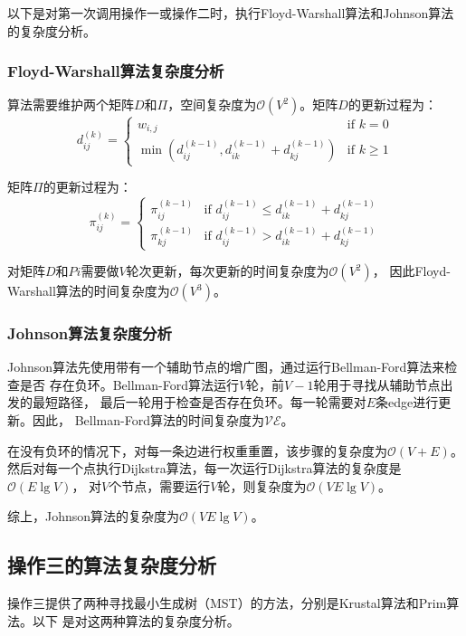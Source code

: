 \documentclass{article}
\begin{document}
以下是对第一次调用操作一或操作二时，执行Floyd-Warshall算法和Johnson算法的复杂度分析。

\subsubsection{Floyd-Warshall算法复杂度分析}
算法需要维护两个矩阵$D$和$\Pi$，空间复杂度为$\mathcal{O}(V^2)$。矩阵$D$的更新过程为：
\begin{equation}
	d_{ij}^{(k)} = 
	\begin{cases}
		w_{i,j} & \text{if  $k=0$} \\
		\min (d_{ij}^{(k-1)}, d_{ik}^{(k-1)} + d_{kj}^{(k-1)}) & \text{if  $k\ge 1$}
	\end{cases} \end{equation}
		


矩阵$\Pi$的更新过程为：
\begin{equation}
	\pi_{ij}^{(k)} = 
	\begin{cases}
		\pi_{ij}^{(k-1)} & \text{if  $d_{ij}^{(k-1)}\le d_{ik}^{(k-1)} + d_{kj}^{(k-1)}$} \\
		\pi_{kj}^{(k-1)} & \text{if  $d_{ij}^{(k-1)} > d_{ik}^{(k-1)} + d_{kj}^{(k-1)}$} 
	\end{cases} \end{equation}

对矩阵$D$和$Pi$需要做$V$轮次更新，每次更新的时间复杂度为$\mathcal{O}(V^2)$，
因此Floyd-Warshall算法的时间复杂度为$\mathcal{O}(V^3)$。

\subsubsection{Johnson算法复杂度分析}
Johnson算法先使用带有一个辅助节点的增广图，通过运行Bellman-Ford算法来检查是否
存在负环。Bellman-Ford算法运行$V$轮，前$V-1$轮用于寻找从辅助节点出发的最短路径，
最后一轮用于检查是否存在负环。每一轮需要对$E$条edge进行更新。因此，
Bellman-Ford算法的时间复杂度为$\mathcal{VE}$。

在没有负环的情况下，对每一条边进行权重重置，该步骤的复杂度为$\mathcal{O}(V+E)$。
然后对每一个点执行Dijkstra算法，每一次运行Dijkstra算法的复杂度是$\mathcal{O}(E\lg V)$，
对$V$个节点，需要运行$V$轮，则复杂度为$\mathcal{O}(VE\lg V)$。

综上，Johnson算法的复杂度为$\mathcal{O}(VE\lg V)$。

\subsection{操作三的算法复杂度分析}
操作三提供了两种寻找最小生成树（MST）的方法，分别是Krustal算法和Prim算法。以下
是对这两种算法的复杂度分析。
\end{document}
